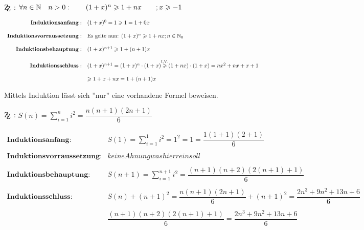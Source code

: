 \documentclass[main.tex]{subfiles}
\begin{document}
\begin{Beweis}
	$\zz$ : $ \forall n \in \mathbb{N} \quad n>0 :  \qquad (1+x)^n \geqslant 1+nx  \qquad;  x\geqslant -1$

	$\begin{array}{rl}
		\textbf{Induktionsanfang}: & (1+x)^0 = 1 \geqslant 1 = 1+0x \\\\
		\textbf{Induktionsvorraussetzung}: & \text{Es gelte nun: } (1+x)^n \geqslant 1+nx ; n\in \mathbb{N}_{0} \\\\
		\textbf{Induktionsbehauptung}: &  (1+x)^{n+1} \geqslant 1+(n+1)x \\\\
		\textbf{Induktionsschluss}: &  (1+x)^{n+1} = (1+x)^n \cdot (1+x) {\overset{\text{I.V.}} {\geqslant}} (1+nx)\cdot(1+x) = nx^2+nx+x+1\\\\
		&\geqslant 1+x+nx = 1+(n+1)x
	\end{array}$
\end{Beweis}


\begin{Beweis}
	Mittels Induktion lässt sich ''nur''  eine vorhandene Formel beweisen.

	$\zz$ : $S(n) = \sum\limits_{i=1}^n i^2 = \dfrac{n(n+1)(2n+1)}{6}$

	$\begin{array}{rl}
		\textbf{Induktionsanfang}: &  S(1) = \sum\limits_{i=1}^1 i^2 = 1^2 = 1 = \dfrac{1(1+1)(2+1)}{6}\\\\
		\textbf{Induktionsvorraussetzung}: & keine Ahnung was hier rein soll\\\\
		\textbf{Induktionsbehauptung}: & S(n+1)=\sum\limits_{i=1}^{n+1} i^2 = \dfrac{(n+1)(n+2)(2(n+1)+1)}{6}\\\\
		\textbf{Induktionsschluss}: & S(n) +(n+1)^2 = \dfrac{n(n+1)(2n+1)}{6} +(n+1)^2 = \dfrac{2n^3 +9n^2+13n+6}{6}\\\\
		& \dfrac{(n+1)(n+2)(2(n+1)+1)}{6}  = \dfrac{2n^3 +9n^2+13n+6}{6} \\\\
	\end{array}$
\end{Beweis}
\end{document}
